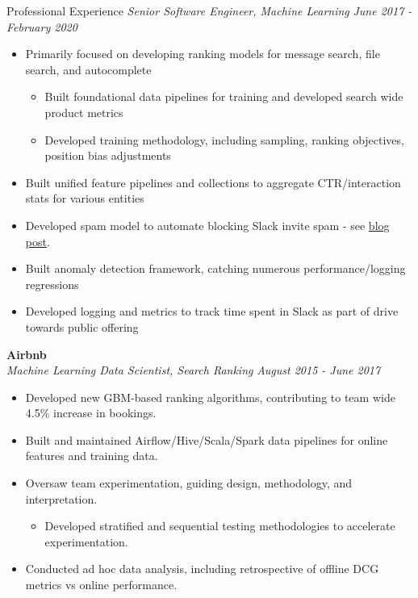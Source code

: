 \documentclass{resume} %
\begin{document}
\begin{rSection}{Professional Experience}
{\em Senior Software Engineer, Machine Learning} \hfill {\em June 2017 - February 2020} \vspace{0.1em} 
\begin{itemize} \itemsep -0.2em
	\item Primarily focused on developing ranking models for message search, file search, and autocomplete
	\vspace{-0.2em}
        \begin{itemize} \itemsep -0.2em
        	\item Built foundational data pipelines for training and developed search wide product metrics
        	\item Developed training methodology, including sampling, ranking objectives, position bias adjustments
		\end{itemize}
	\item Built unified feature pipelines and collections to aggregate CTR/interaction stats for various entities
	\item Developed spam model to automate blocking Slack invite spam - see \href{https://slack.engineering/blocking-slack-invite-spam-with-machine-learning/}{blog post}.
	\item Built anomaly detection framework, catching numerous performance/logging regressions
	\item Developed logging and metrics to track time spent in Slack as part of drive towards public offering
\end{itemize}

{\bf Airbnb} \\
{\em Machine Learning Data Scientist, Search Ranking} \hfill {\em August 2015 - June 2017} \vspace{0.1em} 
\vspace{-0.2em}
\begin{itemize} \itemsep -0.2em
    \item Developed new GBM-based ranking algorithms, contributing to team wide 4.5\% increase in bookings.
    \item Built and maintained Airflow/Hive/Scala/Spark data pipelines for online features and training data.
    \item Oversaw team experimentation, guiding design, methodology, and interpretation.
   	\begin{itemize} \itemsep -0.2em
    	\item Developed stratified and sequential testing methodologies to accelerate experimentation.
    \end{itemize}
    \item Conducted ad hoc data analysis, including retrospective of offline DCG metrics vs online performance.
\end{itemize}



\end{rSection}
\end{document}
